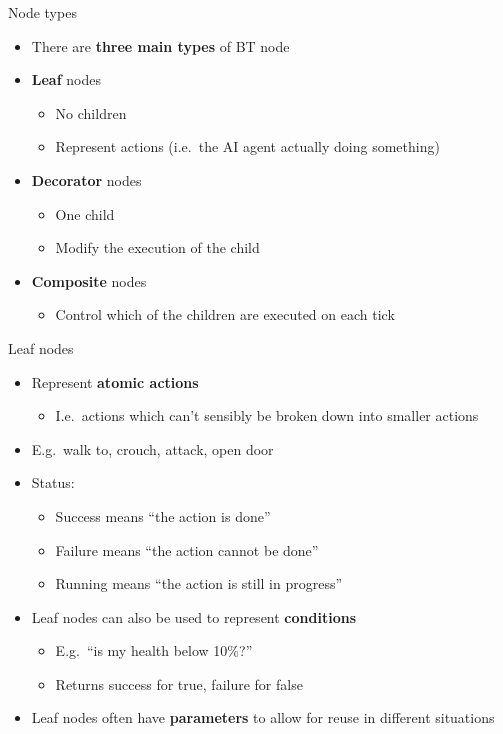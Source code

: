 \begin{frame}{Node types}
	\begin{itemize}
		\pause\item There are \textbf{three main types} of BT node
		\pause\item \textbf{Leaf} nodes
			\begin{itemize}
				\pause\item No children
				\pause\item Represent actions (i.e.\ the AI agent actually doing something)
			\end{itemize}
		\pause\item \textbf{Decorator} nodes
			\begin{itemize}
				\pause\item One child
				\pause\item Modify the execution of the child
			\end{itemize}
		\pause\item \textbf{Composite} nodes
			\begin{itemize}
				\pause\item Control which of the children are executed on each tick
			\end{itemize}
	\end{itemize}
\end{frame}

\begin{frame}{Leaf nodes}
	\begin{itemize}
		\pause\item Represent \textbf{atomic actions}
			\begin{itemize}
				\pause\item I.e.\ actions which can't sensibly be broken down into smaller actions
			\end{itemize}
		\pause\item E.g.\ walk to, crouch, attack, open door
		\pause\item Status:
			\begin{itemize}
				\pause\item Success means ``the action is done''
				\pause\item Failure means ``the action cannot be done''
				\pause\item Running means ``the action is still in progress''
			\end{itemize}
		\pause\item Leaf nodes can also be used to represent \textbf{conditions}
			\begin{itemize}
				\pause\item E.g.\ ``is my health below 10\%?''
				\pause\item Returns success for true, failure for false
			\end{itemize}
		\pause\item Leaf nodes often have \textbf{parameters} to allow for reuse in different situations
	\end{itemize}
\end{frame}

